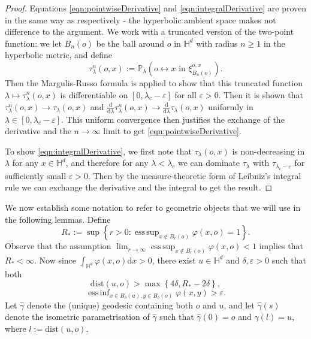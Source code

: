 \documentclass[10pt,a4paper,dvipsnames]{article}
\theoremstyle{definition}
\theoremstyle{remark}
\newcommand{\pla}{\mathbb P_\lambda}
\newcommand{\HypDim}{{\mathbb{H}^d}}
\newcommand{\dd}{\mathrm{d}} %
\DeclareMathOperator*{\esssup}{ess\,sup}
\DeclareMathOperator*{\essinf}{ess\,inf}
\newcommand{\conn}[3]{#1 \longleftrightarrow #2\textrm { in } #3}
\newcommand{\tlam}{\tau_\lambda}
\newcommand{\dist}[1]{\mathrm{dist}\left(#1\right)}
\newcommand{\orig}{o}
\newcommand{\connf}{\varphi}
\numberwithin{equation}{section}
\begin{document}
\begin{proof}
    Equations \eqref{eqn:pointwiseDerivative} and \eqref{eqn:integralDerivative} are proven in the same way as \cite[Lemma~2.2, 2.3]{HeyHofLasMat19} respectively - the hyperbolic ambient space makes not difference to the argument. 
    We work with a truncated version of the two-point function: we let $B_n(\orig)$ be the ball around $\orig$ in $\HypDim$ with radius $n\geq 1$ in the hyperbolic metric, and define
\begin{equation}
    \tlam^n\left(\orig,x\right):= \pla\left(\conn{\orig}{x}{\xi^{\orig,x}_{B_n\left(\orig\right)}}\right).
\end{equation}
    Then the Margulis-Russo formula is applied to show that this truncated function $\lambda\mapsto\tlam^n(\orig,x)$ is differentiable on $\left[0,\lambda_c-\varepsilon\right]$ for all $\varepsilon>0$. Then it is shown that $\tlam^n\left(\orig,x\right)\to\tlam\left(\orig,x\right)$ and $\frac{\dd}{\dd \lambda}\tlam^n\left(\orig,x\right) \to \frac{\dd}{\dd \lambda}\tlam\left(\orig,x\right)$ uniformly in $\lambda\in\left[0,\lambda_c-\varepsilon\right]$. This uniform convergence then justifies the exchange of the derivative and the $n\to\infty$ limit to get \eqref{eqn:pointwiseDerivative}.

    To show \eqref{eqn:integralDerivative}, we first note that $\tlam(\orig,x)$ is non-decreasing in $\lambda$ for any $x\in\HypDim$, and therefore for any $\lambda<\lambda_c$ we can dominate $\tlam$ with $\tau_{\lambda_c-\varepsilon}$ for sufficiently small $\varepsilon>0$. Then by the measure-theoretic form of Leibniz's integral rule we can exchange the derivative and the integral to get the result.
\end{proof}


We now establish some notation to refer to geometric objects that we will use in the following lemmas. Define
\begin{equation}
    R_* := \sup\left\{r>0\colon \esssup_{x\not\in B_r\left(\orig\right)}\connf(x,\orig) = 1\right\}.
\end{equation}
Observe that the assumption $\lim_{r\to\infty}\esssup_{x\not\in B_{r}\left(\orig\right)}\connf(x,\orig)<1$ implies that $R_*<\infty$. Now since $\int_{\HypDim}\connf(x,\orig)\dd x>0$, there exist $u\in\HypDim$ and $\delta,\varepsilon>0$ such that both
\begin{equation}
    \dist{u,\orig} > \max\left\{ 4\delta, R_* - 2\delta\right\},
\end{equation}
\begin{equation}
    \essinf_{x\in B_\delta(u), y\in B_\delta(\orig)}\connf\left(x,y\right) > \varepsilon.
\end{equation}
Let $\hat{\gamma}$ denote the (unique) geodesic containing both $\orig$ and $u$, and let $\hat{\gamma}(s)$ denote the isometric parametrisation of $\hat{\gamma}$ such that $\hat{\gamma}(0)=\orig$ and $\hat{\gamma}(l)=u$, where $l:= \dist{u,\orig}$. 
\end{document}
